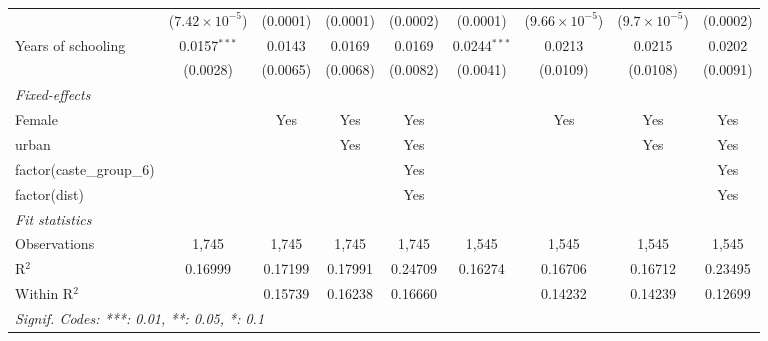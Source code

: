 \begin{table}[htbp]
\begin{tabular}{lcccccccc}
                                & ($7.42\times 10^{-5}$)  & (0.0001)     & (0.0001)       & (0.0002)     & (0.0001)        & ($9.66\times 10^{-5}$)  & ($9.7\times 10^{-5}$)  & (0.0002)\\   
      Years of schooling        & 0.0157$^{***}$          & 0.0143       & 0.0169         & 0.0169       & 0.0244$^{***}$  & 0.0213                  & 0.0215                 & 0.0202\\   
                                & (0.0028)                & (0.0065)     & (0.0068)       & (0.0082)     & (0.0041)        & (0.0109)                & (0.0108)               & (0.0091)\\   
      \midrule
      \emph{Fixed-effects}\\
      Female                    &                         & Yes          & Yes            & Yes          &                 & Yes                     & Yes                    & Yes\\  
      urban                     &                         &              & Yes            & Yes          &                 &                         & Yes                    & Yes\\  
      factor(caste\_group\_6)   &                         &              &                & Yes          &                 &                         &                        & Yes\\  
      factor(dist)              &                         &              &                & Yes          &                 &                         &                        & Yes\\  
      \midrule
      \emph{Fit statistics}\\
      Observations              & 1,745                   & 1,745        & 1,745          & 1,745        & 1,545           & 1,545                   & 1,545                  & 1,545\\  
      R$^2$                     & 0.16999                 & 0.17199      & 0.17991        & 0.24709      & 0.16274         & 0.16706                 & 0.16712                & 0.23495\\  
      Within R$^2$              &                         & 0.15739      & 0.16238        & 0.16660      &                 & 0.14232                 & 0.14239                & 0.12699\\  
      \midrule \midrule
      \multicolumn{9}{l}{\emph{Signif. Codes: ***: 0.01, **: 0.05, *: 0.1}}\\
   \end{tabular}
\end{table}



